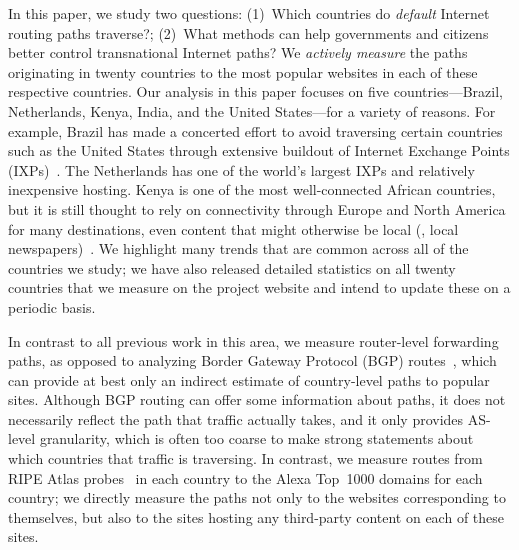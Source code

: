 In this paper, we study two questions: (1)~Which countries do {\em   default}
Internet routing paths traverse?; (2)~What methods can  help governments and
citizens better control transnational Internet paths?  We {\em actively
measure} the paths originating in twenty countries to the most popular
websites in each of these respective countries.
Our analysis in this paper focuses on five countries---Brazil, Netherlands,
Kenya, India, and the United States---for a variety of reasons.  For example,
Brazil has made a concerted effort to avoid traversing certain countries such
as the United States through extensive buildout of Internet Exchange Points
(IXPs)~\cite{brito2016dissecting}. The Netherlands has one of the world's largest IXPs and relatively
inexpensive hosting. Kenya is one of the most well-connected African
countries, but it is still thought to rely on connectivity through Europe and
North America for many destinations, even content that might otherwise be
local (\eg, local newspapers)~\cite{gupta2014peering,fanou2015diversity,chavula2014quantifying,fanou2016pushing}. We highlight many trends that are common across all
of the countries we study; we have also released detailed statistics on all twenty
countries that we measure on the project website and intend to update these on a
periodic basis.

In contrast to all previous work in this area, we measure router-level
forwarding paths, as opposed to analyzing Border Gateway Protocol (BGP)
routes~\cite{karlin2009nation,shah2015characterizing}, which can provide at
best only an indirect estimate of country-level paths to popular sites.
Although BGP routing can offer some information about paths, it does not
necessarily reflect the path that traffic actually takes, and it only provides
AS-level granularity, which is often too coarse to make strong statements
about which countries that traffic is traversing.  In contrast, we measure
routes from RIPE Atlas probes~\cite{ripe_atlas} in each country to the Alexa
Top~1000 domains for each country; we directly measure the paths not only to
the websites corresponding to themselves, but also to the sites hosting any
third-party content on each of these sites.

